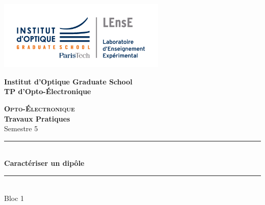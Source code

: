 \documentclass[a4paper,11pt,titlepage]{article} %
\begin{document}
\begin{titlepage}

\begin{center}
	\begin{minipage}{2.5cm}
	\begin{center}
		\includegraphics[width=8cm]{images/Logo-LEnsE.png}
	\end{center}
\end{minipage}\hfill
\begin{minipage}{10cm}
	\begin{center}
	\textbf{Institut d'Optique Graduate School }\\[0.1cm]
    \textbf{TP d'Opto-Électronique}


	\end{center}
\end{minipage}\hfill


\vspace{5cm}


{\huge \bfseries \textsc{Opto-Électronique}} \\[0.5cm]
{\large \bfseries Travaux Pratiques} \\[0.2cm]
Semestre 5

\vspace{2cm}
\rule{\linewidth}{0.3mm} \\[0.4cm]
{ \huge \bfseries\color{violet_iogs} Caractériser un dipôle \\[0.4cm] }
\rule{\linewidth}{0.3mm} \\[1cm]
{\huge Bloc 1}

\vfill


\end{center}
\end{titlepage}

\newpage
\strut %
\newpage
\pagestyle{empty}
\end{document}

